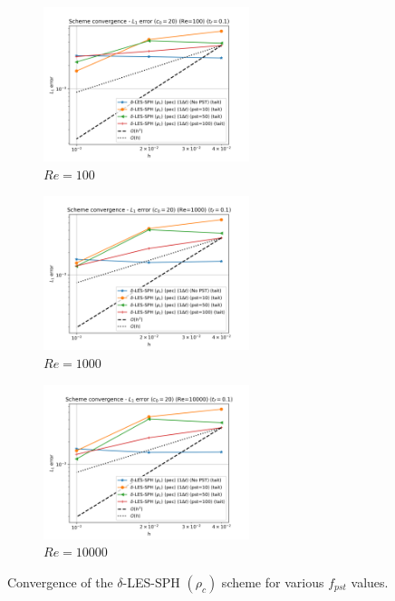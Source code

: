 \begin{figure}[htbp!]
  \begin{subfigure}{7cm}
    \centering\includegraphics[width=6cm]{Code-Figures/deltales/pst/dt_pois_conv_c0_20_re_100.png}
    \caption{$Re = 100$}
  \end{subfigure}
  \begin{subfigure}{7cm}
    \centering\includegraphics[width=6cm]{Code-Figures/deltales/pst/dt_pois_conv_c0_20_re_1000.png}
    \caption{$Re = 1000$}
  \end{subfigure}
  \begin{subfigure}{7cm}
    \centering\includegraphics[width=6cm]{Code-Figures/deltales/pst/dt_pois_conv_c0_20_re_10000.png}
    \caption{$Re = 10000$}
  \end{subfigure}
  \caption{Convergence of the $\delta$-LES-SPH $(\rho_c)$ scheme for various $f_{pst}$ values.}
  \label{fig:deltales-pst}
\end{figure}

